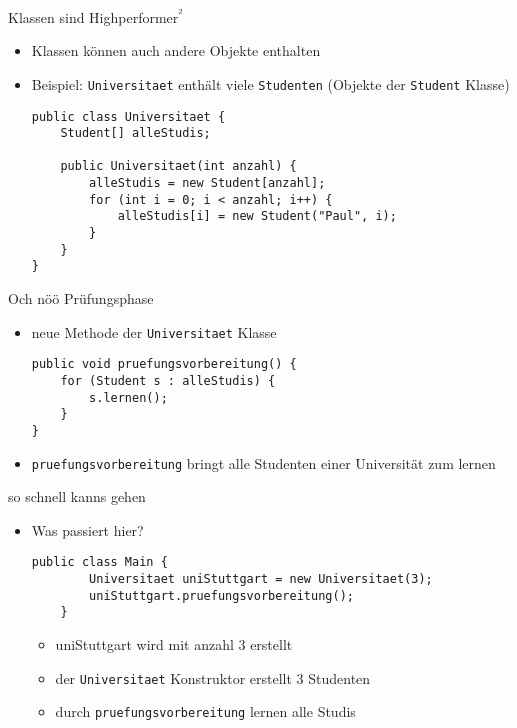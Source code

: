 \documentclass{../../presentation}
\begin{document}
\begin{frame}[fragile]{Klassen sind Highperformer\textsuperscript{²}}

	\begin{itemize}
		\item<2-> Klassen können auch andere Objekte enthalten
		\item<3-> Beispiel: \texttt{Universitaet} enthält viele \texttt{Studenten} (Objekte der \texttt{Student} Klasse)
		      \begin{verbatim}
public class Universitaet {
    Student[] alleStudis;

    public Universitaet(int anzahl) {
        alleStudis = new Student[anzahl];
        for (int i = 0; i < anzahl; i++) {
            alleStudis[i] = new Student("Paul", i);
        }
    }
}
\end{verbatim}
	\end{itemize}
\end{frame}


\begin{frame}[fragile]{Och nöö Prüfungsphase}

	\begin{itemize}
		\item<2-> neue Methode der \texttt{Universitaet} Klasse
		      \begin{verbatim}
public void pruefungsvorbereitung() {
    for (Student s : alleStudis) {
        s.lernen();
    }
}
\end{verbatim}
		\item<3-> \texttt{pruefungsvorbereitung} bringt alle Studenten einer Universität zum lernen
	\end{itemize}
\end{frame}

\begin{frame}[fragile]{so schnell kanns gehen}

	\begin{itemize}
		\item<2-> Was passiert hier?
		      \begin{verbatim}
public class Main {
        Universitaet uniStuttgart = new Universitaet(3);
        uniStuttgart.pruefungsvorbereitung();
    }
\end{verbatim}
		      \begin{itemize}
			      \item<4->[\textbullet]uniStuttgart wird mit anzahl 3 erstellt
			      \item<5->[\textbullet]der \texttt{Universitaet} Konstruktor erstellt 3 Studenten
			      \item<6->[\textbullet]durch \texttt{pruefungsvorbereitung} lernen alle Studis
		      \end{itemize}
	\end{itemize}
\end{frame}
\end{document}
